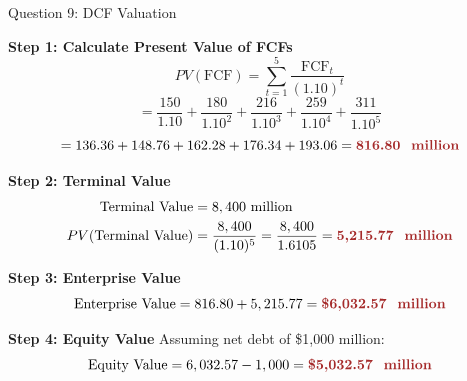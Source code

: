 \documentclass[aspectratio=169]{beamer}
\newcommand{\highlight}[1]{\textcolor{crimson}{\textbf{#1}}}
\begin{document}
	\begin{frame}{Question 9: DCF Valuation}
		
		\textbf{Step 1: Calculate Present Value of FCFs}
		\[
		PV(\text{FCF}) = \sum_{t=1}^{5} \frac{\text{FCF}_t}{(1.10)^t}
		\]
		\[
		= \frac{150}{1.10} + \frac{180}{1.10^2} + \frac{216}{1.10^3} + \frac{259}{1.10^4} + \frac{311}{1.10^5}
		\]
		\[
		= 136.36 + 148.76 + 162.28 + 176.34 + 193.06 = \highlight{816.80 \text{ million}}
		\]
		
		\textbf{Step 2: Terminal Value}
		\begin{align*}
			\text{Terminal Value} &= 8,400 \text{ million} \\
			PV(\text{Terminal Value}) &= \frac{8,400}{(1.10)^5} = \frac{8,400}{1.6105} = \highlight{5,215.77 \text{ million}}
		\end{align*}
		
		\textbf{Step 3: Enterprise Value}
		\[
		\text{Enterprise Value} = 816.80 + 5,215.77 = \highlight{\$6,032.57 \text{ million}}
		\]
		
		\textbf{Step 4: Equity Value}
		Assuming net debt of \$1,000 million:
		\[
		\text{Equity Value} = 6,032.57 - 1,000 = \highlight{\$5,032.57 \text{ million}}
		\]
	\end{frame}
	
\end{document}
